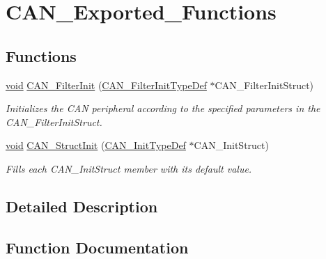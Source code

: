 \hypertarget{group___c_a_n___exported___functions}{}\section{C\+A\+N\+\_\+\+Exported\+\_\+\+Functions}
\label{group___c_a_n___exported___functions}
\subsection*{Functions}
\begin{DoxyCompactItemize}
\item 
\hyperlink{usb__devapi_8h_afabf60e7f57651d6d595a02c75f07cd0}{void} \hyperlink{group___c_a_n___exported___functions_ga39476830280340363c51041be6b12647}{C\+A\+N\+\_\+\+Filter\+Init} (\hyperlink{struct_c_a_n___filter_init_type_def}{C\+A\+N\+\_\+\+Filter\+Init\+Type\+Def} $\ast$C\+A\+N\+\_\+\+Filter\+Init\+Struct)
\begin{DoxyCompactList}\small\item\em Initializes the C\+AN peripheral according to the specified parameters in the C\+A\+N\+\_\+\+Filter\+Init\+Struct. \end{DoxyCompactList}\item 
\hyperlink{usb__devapi_8h_afabf60e7f57651d6d595a02c75f07cd0}{void} \hyperlink{group___c_a_n___exported___functions_gad77ad810868ed111755fc9e8ae0c7646}{C\+A\+N\+\_\+\+Struct\+Init} (\hyperlink{struct_c_a_n___init_type_def}{C\+A\+N\+\_\+\+Init\+Type\+Def} $\ast$C\+A\+N\+\_\+\+Init\+Struct)
\begin{DoxyCompactList}\small\item\em Fills each C\+A\+N\+\_\+\+Init\+Struct member with its default value. \end{DoxyCompactList}\end{DoxyCompactItemize}


\subsection{Detailed Description}


\subsection{Function Documentation}

